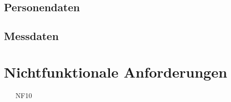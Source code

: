 \documentclass[a4paper,12pt]{article}
\begin{document}
\begin{itemize}[nosep]





\end{itemize}

\subsection{Personendaten}
\subsection{Messdaten}

\section{Nichtfunktionale Anforderungen}
\begin{itemize}[nosep]
\leftskip=0.5cm
\item[NF10]
\end{itemize}










\end{document}
